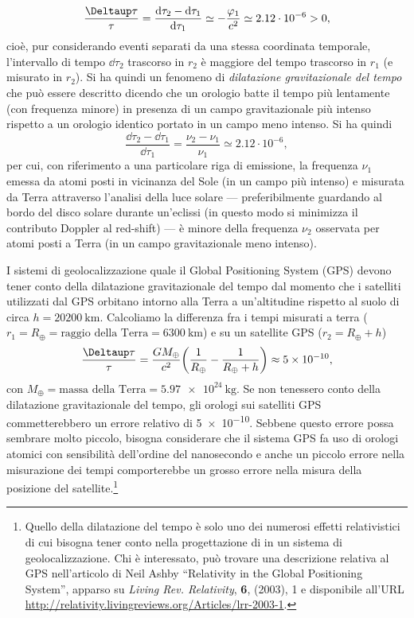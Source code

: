 \begin{equation}
  \frac{\var\tau}{\tau} = \frac{\dd\tau_{2} - \dd\tau_{1}}{\dd\tau_{1}} \simeq 
  - \frac{\phi_{1}}{c^{2}} \simeq 2.12 \cdot 10^{-6} > 0,
\end{equation}
cioè, pur considerando eventi separati da una stessa coordinata temporale,
l'intervallo di tempo $\dd\tau_2$ trascorso in $r_{2}$ è maggiore del tempo
trascorso in $r_{1}$ (e misurato in $r_2$).  Si ha quindi un fenomeno di
 \emph{dilatazione
  gravitazionale del tempo} che può essere descritto dicendo che un orologio
batte il tempo più lentamente (con frequenza minore) in presenza di un campo
gravitazionale più intenso rispetto a un orologio identico portato in un campo
meno intenso.  Si ha quindi
\begin{equation}
   \frac{\dd\tau_{2} - \dd\tau_{1}}{\dd\tau_{1}} =
   \frac{    \nu_2  -      \nu_1} {\nu_1}       \simeq  2.12 \cdot 10^{-6},
\end{equation}
per cui, con riferimento a una particolare riga di emissione, la frequenza
$\nu_1$ emessa da atomi posti in vicinanza del Sole (in un campo più intenso) e
misurata da Terra attraverso l'analisi della luce solare --- preferibilmente
guardando al bordo del disco solare durante un'eclissi (in questo modo si
minimizza il contributo Doppler al red-shift) --- è minore della frequenza
$\nu_2$ osservata per atomi posti a Terra (in un campo gravitazionale meno
intenso).

I sistemi di geolocalizzazione quale il Global Positioning System (GPS) devono
tener conto della dilatazione gravitazionale del tempo dal momento che i
satelliti utilizzati dal GPS orbitano intorno alla Terra a un'altitudine
rispetto al suolo di circa $h = \SI{20200}{\kilo\metre}$.  Calcoliamo la
differenza fra i tempi misurati a terra
($r_{1} = R_{\oplus} = \text{raggio della Terra} = \SI{6300}{\kilo\metre}$) e su
un satellite GPS ($r_{2} = R_{\oplus} + h$)
\begin{equation}
  \frac{\var \tau}{\tau} = \frac{GM_{\oplus}}{c^{2}} \bigg(\frac{1}{R_{\oplus}}
  - \frac{1}{R_{\oplus} + h}\bigg) \approx \num{5e-10},
\end{equation}
con $M_{\oplus} = \text{massa della Terra} = \SI{5.97e24}{\kilo\gram}$.  Se non
tenessero conto della dilatazione gravitazionale del tempo, gli orologi sui
satelliti GPS commetterebbero un errore relativo di \num{5e-10}.  Sebbene questo
errore possa sembrare molto piccolo, bisogna considerare che il sistema GPS fa
uso di orologi atomici con sensibilità dell'ordine del nanosecondo e anche un
piccolo errore nella misurazione dei tempi comporterebbe un grosso errore nella
misura della posizione del
satellite.\footnote{Quello della dilatazione del tempo è solo uno dei numerosi
  effetti relativistici di cui bisogna tener conto nella progettazione di in un
  sistema di geolocalizzazione.  Chi è interessato, può trovare una descrizione
  relativa al GPS nell'articolo di Neil Ashby ``Relativity in the Global
  Positioning System'', apparso su \emph{Living Rev. Relativity}, \textbf{6},
  (2003), 1 e disponibile all'URL
  \url{http://relativity.livingreviews.org/Articles/lrr-2003-1}.}

